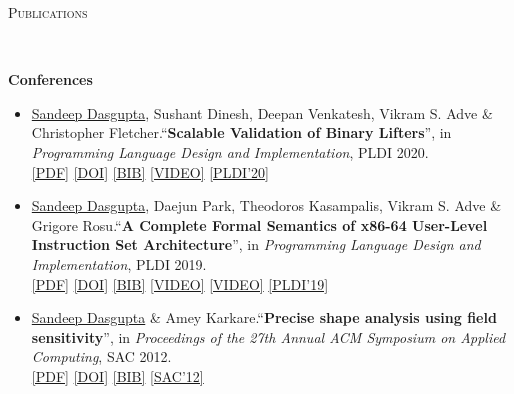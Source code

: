 \documentclass[9pt]{article}
\newenvironment{changemargin}[2]{%
  \begin{list}{}{%
    \setlength{\topsep}{0pt}%
    \setlength{\leftmargin}{#1}%
    \setlength{\rightmargin}{#2}%
    \setlength{\listparindent}{\parindent}%
    \setlength{\itemindent}{\parindent}%
    \setlength{\parsep}{\parskip}%
  }%
  \item[]}{\end{list}
}
\newcommand{\lineover}{
	\begin{changemargin}{-0.05in}{-0.05in}
		\vspace*{-8pt}
		\hrulefill \\
		\vspace*{-2pt}
	\end{changemargin}
}
\newcommand{\header}[1]{
	\begin{changemargin}{-0.5in}{-0.5in}
		\scshape{#1}\\
  	\lineover
	\end{changemargin}
}
\newenvironment{body} {
	\vspace*{-16pt}
	\begin{changemargin}{-0.25in}{-0.5in}
  }	
	{\end{changemargin}
}
\begin{document}
\smallskip

\header{Publications}
\begin{body}
\vspace{14pt}
\textbf{Conferences}\\
	\vspace*{-4pt}
	\begin{itemize} \itemsep -0pt

		\item \underline{Sandeep Dasgupta}, Sushant Dinesh, Deepan Venkatesh, Vikram S. Adve  \& Christopher Fletcher.``\textbf{Scalable Validation of Binary Lifters}'', in \emph{Programming Language Design and Implementation}, PLDI 2020. \\
                \href{https://sdasgup3.github.io/files/pldi_2020.pdf}{[PDF]}
                \href{https://dl.acm.org/doi/abs/10.1145/3385412.3385964}{[DOI]}
                \href{https://sdasgup3.github.io/files/pldi_2020.bib}{[BIB]}
                \href{https://youtu.be/_lLaNmPEwkw?list=PLyrlk8Xaylp5mvxARtX5ncjy9p4X_Ajwd&t=8&t=21s}{[VIDEO]}
                \href{https://pldi20.sigplan.org/}{[PLDI'20]}

		\item \underline{Sandeep Dasgupta}, Daejun Park, Theodoros Kasampalis, Vikram S. Adve  \& Grigore Rosu.``\textbf{A Complete Formal Semantics of x86-64 User-Level
Instruction Set Architecture}'', in \emph{Programming Language Design and Implementation}, PLDI 2019. \\
                \href{https://sdasgup3.github.io/files/pldi_2019.pdf}{[PDF]}
                \href{https://dl.acm.org/citation.cfm?id=3314221.3314601}{[DOI]}
                \href{https://sdasgup3.github.io/files/pldi_2019.bib}{[BIB]}
                \href{https://www.youtube.com/watch?v=eBZtmaNAJwo&t=21s}{[VIDEO]}
                \href{https://www.youtube.com/watch?v=eBZtmaNAJwo&t=21s}{[VIDEO]}
                \href{https://conf.researchr.org/home/pldi-2019}{[PLDI'19]}

		\item \underline{Sandeep Dasgupta} \& Amey Karkare.``\textbf{Precise shape analysis using field sensitivity}'', in \emph{Proceedings of the 27th Annual ACM Symposium on Applied Computing}, SAC 2012. \\
                \href{https://sdasgup3.github.io/files/sac_2012.pdf}{[PDF]}
                \href{http://dx.doi.org/10.1145/2245276.2231982}{[DOI]}
                \href{https://sdasgup3.github.io/files/sac_2012.bib}{[BIB]}
                \href{https://www.sigapp.org/sac/sac2012/}{[SAC'12]}


\end{itemize}
\end{body}
\end{document}
